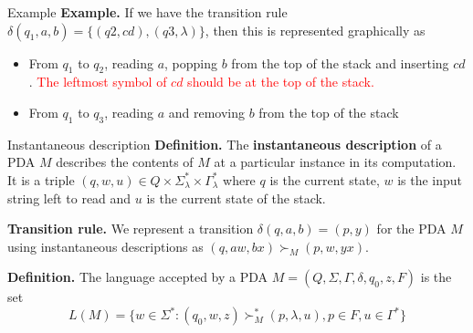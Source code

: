 \documentclass[10pt]{beamer}
\begin{document}
\begin{frame}{Example}
    \textbf{Example.} If we have the transition rule $\delta (q_1, a, b) =\{(q2, cd),(q3, \lambda)\}$, then this is represented graphically as
    \begin{center}
    \end{center}
    \begin{itemize}
        \item From $q_1$ to $q_2$, reading $a$, popping $b$ from the top of the stack and inserting $cd$. \textcolor{red}{The leftmost symbol of $cd$ should be at the top of the stack.}
        \item From $q_1$ to $q_3$, reading $a$ and removing $b$ from the top of the stack
    \end{itemize}
\end{frame}


\begin{frame}{Instantaneous description}
    \textbf{Definition.} The \textbf{instantaneous description} of a PDA $M$ describes the contents of $M$ at a particular instance in its computation. It is a triple $(q, w, u) \in Q \times \Sigma_\lambda^* \times \Gamma_\lambda^*$ where $q$ is the current state, $w$ is the input string left to read and $u$ is the current state of the stack.

    \textbf{Transition rule.} We represent a transition $\delta(q, a, b) = (p, y)$ for the PDA $M$ using instantaneous descriptions as $(q, aw, bx) \succ_M (p, w, yx)$.

    \textbf{Definition.} The language accepted by a PDA $M = (Q, \Sigma, \Gamma, \delta, q_0, z,F)$ is the set
    $$
        L(M) = \{w \in \Sigma^* : (q_0, w, z) \succ_M^* (p, \lambda, u), p \in F, u \in \Gamma^*\}
    $$
\end{frame}
\end{document}
